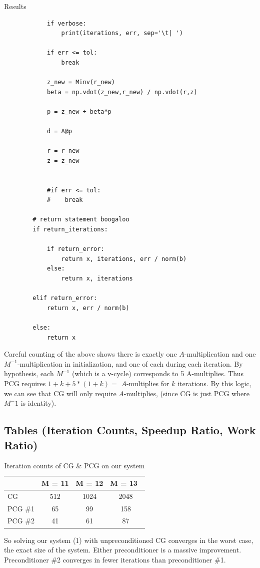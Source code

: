 \documentclass[10pt]{article}
\theoremstyle{definition}
\begin{document}
\begin{section}{Results}
\begin{lstlisting}
	        if verbose:
	            print(iterations, err, sep='\t| ')
	
	        if err <= tol:
	            break
	        
	        z_new = Minv(r_new)
	        beta = np.vdot(z_new,r_new) / np.vdot(r,z)
	
	        p = z_new + beta*p
	
	        d = A@p
	    
	        r = r_new
	        z = z_new
	
	
	        #if err <= tol:
	        #    break
	    
	    # return statement boogaloo
	    if return_iterations:
	
	        if return_error:
	            return x, iterations, err / norm(b)
	        else:
	            return x, iterations
	
	    elif return_error:
	        return x, err / norm(b)
	
	    else:
	        return x
	\end{lstlisting}
	
Careful counting of the above shows there is exactly one $A$-multiplication and one
$M^{-1}$-multiplication in initialization, and one of each during each iteration. By hypothesis, each $M^{-1}$ (which is a v-cycle) corresponds to 5 A-multiplies. Thus PCG requires $ 1+k + 5*(1+k) =$  $A$-multiplies for $k$ iterations. By this logic, we can see that CG will only require  $A$-multiplies, (since CG is just PCG where $M^-1$ is identity).

\subsection{Tables (Iteration Counts, Speedup Ratio, Work Ratio)}
\begin{table}[h]\Large
\begin{center}
\begin{tabular}{lc|c|c}
	            &  M = 11 	& M = 12 	& M = 13\ \\ \hline
CG				&  512 		& 1024 		& 2048  \\
PCG \#1        	& 65 		& 99 		& 158  \\
PCG \#2         & 41 		& 61 		& 87  \\
\end{tabular}
\caption{Iteration counts of CG \& PCG on our system}
\end{center}
\end{table}
So solving our system (1) with unpreconditioned CG converges in the worst case, the exact size of the system. Either preconditioner is a massive improvement. Preconditioner \#2 converges in fewer iterations than preconditioner \#1.


\end{section}
\end{document}
